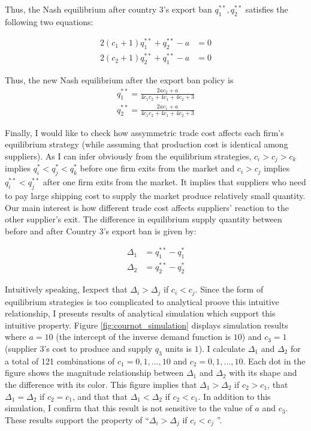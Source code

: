 \documentclass[a4paper,12pt]{article}
\begin{document}
Thus, the Nash equilibrium after country $3$'s export ban $q_1^{**}, q_2^{**}$ satisfies the following two equations:

\begin{align}
    2(c_1 + 1) q_1^{**} + q_2 ^{**} - a &= 0 \\
    2(c_2 + 1) q_2^{**} + q_1 ^ {**} - a &= 0 
\end{align}

Thus, the new Nash equilibrium after the export ban policy is
\begin{align}
    q_1^{**} = \frac{2 a c_{2} + a}{4 c_{1} c_{2} + 4 c_{1} + 4 c_{2} + 3} \\
    q_2^{**} = \frac{2 a c_{1} + a}{4 c_{1} c_{2} + 4 c_{1} + 4 c_{2} + 3}
\end{align}

Finally, I would like to check how assymmetric trade cost affects each firm's equilibrium strategy (while assuming that production cost is identical among suppliers). As I can infer obviously from the equilibrium strategies, $c_i > c_j > c_k$ implies $q_i^* < q_j^* < q_k^*$ before one firm exits from the market and $c_i > c_j$ implies $q_i^{**} < q_j^{**}$ after one firm exits from the market. It implies that suppliers who need to pay large shipping cost to supply the market produce relatively small quantity. Our main interest is how different trade cost affects suppliers' reaction to the other supplier's exit. The difference in equilibrium supply quantity between before and after Country $3$'s export ban is given by:

\begin{align}
    \Delta_1 &= q_1^{**} - q_1^{*} \\
    \Delta_2 &= q_2^{**} - q_2^{*}
\end{align}

Intuitively speaking, Iexpect that $\Delta_i > \Delta_j$ if $c_i < c_j$. Since the form of equilibrium strategies is too complicated to analytical proove this intuitive relationship, I presents results of analytical simulation which support this intuitive property. Figure \ref{fig:cournot_simulation} displays simulation results where $a = 10$ (the intercept of the inverse demand function is $10$) and $c_3 = 1$ (supplier $3$'s cost to produce and supply $q_3$ units is $1$). I calculate $\Delta_1$ and $\Delta_2$ for a total of 121 combinations of $c_1 = 0, 1, ..., 10$ and $c_2 = 0, 1, ..., 10$. Each dot in the figure shows the magnitude relationship between $\Delta_1$ and $\Delta_2$ with its shape and the difference with its color. This figure implies that $\Delta_1 > \Delta_2$ if $c_2 > c_1$, that $\Delta_1 = \Delta_2$ if $c_2 = c_1$, and that that $\Delta_1 < \Delta_2$ if $c_2 < c_1$. In addition to this simulation, I confirm that this result is not sensitive to the value of $a$ and $c_3$. These results support the property of ``$\Delta_i > \Delta_j$ if $c_i < c_j$ ''. \\
\end{document}
